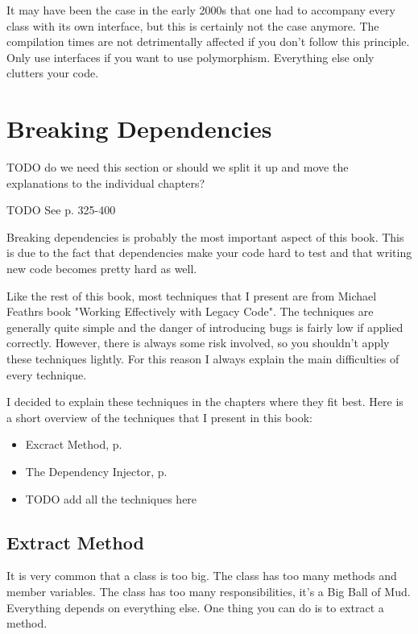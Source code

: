 It may have been the case in the early 2000s that one had to accompany every class with its own interface, but this is certainly not the case anymore. The compilation times are not detrimentally affected if you don't follow this principle. Only use interfaces if you want to use polymorphism. Everything else only clutters your code.

\section{Breaking Dependencies}

TODO do we need this section or should we split it up and move the explanations to the individual chapters?

TODO See p. 325-400

Breaking dependencies is probably the most important aspect of this book. This is due to the fact that dependencies make your code hard to test and that writing new code becomes pretty hard as well. 

Like the rest of this book, most techniques that I present are from Michael Feathrs book "Working Effectively with Legacy Code". The techniques are generally quite simple and the danger of introducing bugs is fairly low if applied correctly. However, there is always some risk involved, so you shouldn't apply these techniques lightly. For this reason I always explain the main difficulties of every technique.

I decided to explain these techniques in the chapters where they fit best. Here is a short overview of the techniques that I present in this book:

\begin{itemize}
    \item Excract Method, p. \pageref{sec:extract_method}
    \item The Dependency Injector, p. \pageref{sec:dependency_injection}
    \item TODO add all the techniques here
\end{itemize}

\subsection{Extract Method}\label{sec:extract_method}

It is very common that a class is too big. The class has too many methods and member variables. The class has too many responsibilities, it's a Big Ball of Mud. Everything depends on everything else. One thing you can do is to extract a method.

